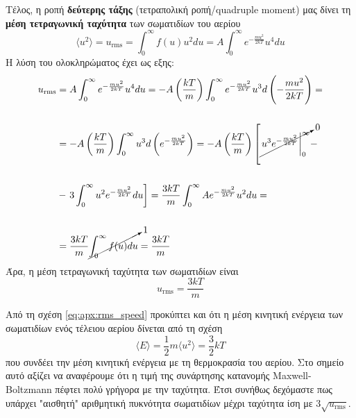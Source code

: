 Τέλος, η ροπή \textbf{δεύτερης τάξης} (τετραπολική ροπή/quadruple moment) μας δίνει τη \textbf{μέση τετραγωνική ταχύτητα} των σωματιδίων του αερίου
\begin{equation}
    \label{eq:apx:quadruple_moment}
    \langle u^2 \rangle = u_{\text{rms}} = \int_{0}^{\infty} f(u) u^2 du = A \int_{0}^{\infty} e^{-\frac{mu^2}{2kT}} u^4 du
\end{equation}
Η λύση του ολοκληρώματος έχει ως εξης:
\begin{align*}
    u_{\text{rms}} & = A \int_{0}^{\infty} e^{-\frac{mu^2}{2kT}} u^4 du = -A \left( \frac{kT}{m} \right) \int_{0}^{\infty} e^{-\frac{mu^2}{2kT}} u^3 d \left( - \frac{mu^2}{2kT} \right) = \\\\
    &= -A \left( \frac{kT}{m} \right) \int_{0}^{\infty} u^3 d \left( e^{- \frac{mu^2}{2kT}} \right) = -A \left( \frac{kT}{m} \right) \left [ \cancelto{0}{\left. u^3 e^{- \frac{mu^2}{2kT}} \right|_{0}^{\infty}} - \right. \\\\
    &- \left. 3 \int_{0}^{\infty} u^2 e^{-\frac{mu^2}{2kT}} du \right] = \frac{3kT}{m} \int_{0}^{\infty} A e^{-\frac{mu^2}{2kT}} u^2 du = \\\\
    &= \frac{3kT}{m} \cancelto{1}{\int_{0}^{\infty} f(u) du} = \frac{3kT}{m}
\end{align*}
Άρα, η μέση τετραγωνική ταχύτητα των σωματιδίων είναι
\begin{equation}
    \label{eq:apx:rms_speed}
    \boxed{u_{\text{rms}} = \frac{3kT}{m}}
\end{equation}

Από τη σχέση \eqref{eq:apx:rms_speed} προκύπτει και ότι η μέση κινητική ενέργεια των σωματιδίων ενός τέλειου αερίου δίνεται από τη σχέση
\begin{equation}
    \label{eq:apx:mean_kinetic_energy}
    \langle E \rangle = \frac{1}{2} m \langle u^2 \rangle = \frac{3}{2} kT
\end{equation}
που συνδέει την μέση κινητική ενέργεια με τη θερμοκρασία του αερίου.
Στο σημείο αυτό αξίζει να αναφέρουμε ότι η τιμή της συνάρτησης κατανομής Maxwell-Boltzmann πέφτει πολύ γρήγορα με την ταχύτητα. Έτσι συνήθως δεχόμαστε πως υπάρχει "αισθητή" αριθμητική πυκνότητα σωματιδίων μέχρι ταχύτητα ίση με $3 \sqrt{u_{\text{rms}}}$.